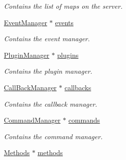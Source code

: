 \begin{DoxyCompactItemize}
\begin{DoxyCompactList}\small\item\em Contains the list of maps on the server. \end{DoxyCompactList}\item 
\hypertarget{classManiaPP_a326ab543ab98eefcba8a4b616e794b96}{\hyperlink{classEventManager}{Event\-Manager} $\ast$ \hyperlink{classManiaPP_a326ab543ab98eefcba8a4b616e794b96}{events}}\label{classManiaPP_a326ab543ab98eefcba8a4b616e794b96}

\begin{DoxyCompactList}\small\item\em Contains the event manager. \end{DoxyCompactList}\item 
\hypertarget{classManiaPP_a199f7d80431e7f13e52e6010347f644a}{\hyperlink{classPluginManager}{Plugin\-Manager} $\ast$ \hyperlink{classManiaPP_a199f7d80431e7f13e52e6010347f644a}{plugins}}\label{classManiaPP_a199f7d80431e7f13e52e6010347f644a}

\begin{DoxyCompactList}\small\item\em Contains the plugin manager. \end{DoxyCompactList}\item 
\hypertarget{classManiaPP_af468d4b6eea93fd836950551eb7d3a01}{\hyperlink{classCallBackManager}{Call\-Back\-Manager} $\ast$ \hyperlink{classManiaPP_af468d4b6eea93fd836950551eb7d3a01}{callbacks}}\label{classManiaPP_af468d4b6eea93fd836950551eb7d3a01}

\begin{DoxyCompactList}\small\item\em Contains the callback manager. \end{DoxyCompactList}\item 
\hypertarget{classManiaPP_afefa9bf6ecf35fffd4d3229e17e4dd2f}{\hyperlink{classCommandManager}{Command\-Manager} $\ast$ \hyperlink{classManiaPP_afefa9bf6ecf35fffd4d3229e17e4dd2f}{commands}}\label{classManiaPP_afefa9bf6ecf35fffd4d3229e17e4dd2f}

\begin{DoxyCompactList}\small\item\em Contains the command manager. \end{DoxyCompactList}\item 
\hypertarget{classManiaPP_a48cb1ddf328d18361417986fe8ab069c}{\hyperlink{classMethods}{Methods} $\ast$ \hyperlink{classManiaPP_a48cb1ddf328d18361417986fe8ab069c}{methods}}\label{classManiaPP_a48cb1ddf328d18361417986fe8ab069c}


\end{DoxyCompactItemize}
